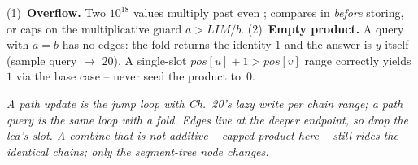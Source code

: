 \begin{hardeningbox}
(1)~\textbf{Overflow.} Two \(10^{18}\) values multiply past even ;  compares in  \emph{before} storing, or caps on the multiplicative guard \(a>\mathit{LIM}/b\).  (2)~\textbf{Empty product.} A query with \(a=b\) has no edges: the fold returns the identity \(1\) and the answer is \(y\) itself (sample query  \(\to\) \(20\)).  A single-slot \(\mathit{pos}[u]+1>\mathit{pos}[v]\) range correctly yields \(1\) via the  base case -- never seed the product to~\(0\).
\end{hardeningbox}

\begin{recallbox}
\emph{A path update is the jump loop with Ch.~20's lazy write per chain range; a path query is the same loop with a fold. Edges live at the deeper endpoint, so drop the lca's slot. A combine that is not additive -- capped product here -- still rides the identical chains; only the segment-tree node changes.}
\end{recallbox}
